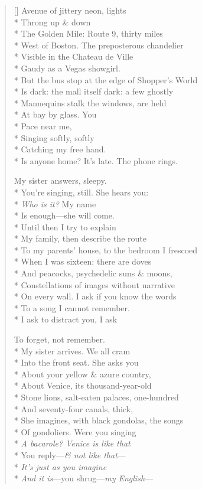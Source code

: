 \label{ch:the_golden_mile}
\settowidth{\versewidth}{Off the Golden Mile: behind us, night closes over}
\begin{verse}[\versewidth]
Avenue of jittery neon, lights\\*
Throng up \& down\\*
The Golden Mile: Route 9, thirty miles\\*
West of Boston. The preposterous chandelier\\*
Visible in the Chateau de Ville\\*
Gaudy as a Vegas showgirl.\\*
But the bus stop at the edge of Shopper's World\\*
Is dark: the mall itself dark: a few ghostly\\*
Mannequins stalk the windows, are held\\*
At bay by glass. You\\*
Pace near me,\\*
Singing softly, softly\\*
Catching my free hand.\\*
Is anyone home?  It's late.  The phone rings.

My sister answers, sleepy.\\*
You're singing, still. She hears you:\\*
\textit{Who is it?} My name\\*
Is enough---she will come.\\*
Until then I try to explain\\*
My family, then describe the route\\*
To my parents' house, to the bedroom I frescoed\\*
When I was sixteen: there are doves\\*
And peacocks, psychedelic suns \& moons,\\*
Constellations of images without narrative\\*
On every wall. I ask if you know the words\\*
To a song I cannot remember.\\*
I ask to distract you, I ask

To forget, not remember.\\*
My sister arrives.  We all cram\\*
Into the front seat. She asks you\\*
About your yellow \& azure country,\\*
About Venice, its thousand-year-old\\*
Stone lions, salt-eaten palaces, one-hundred\\*
And seventy-four canals, thick,\\*
She imagines, with black gondolas, the songs\\*
Of gondoliers. Were you singing\\*
\textit{A bacarole? Venice is like that}\\*
You reply---\textit{\& not like that}---\\*
\textit{It's just as you imagine}\\*
\textit{And it is}---you shrug---\textit{my English}---


\end{verse}
